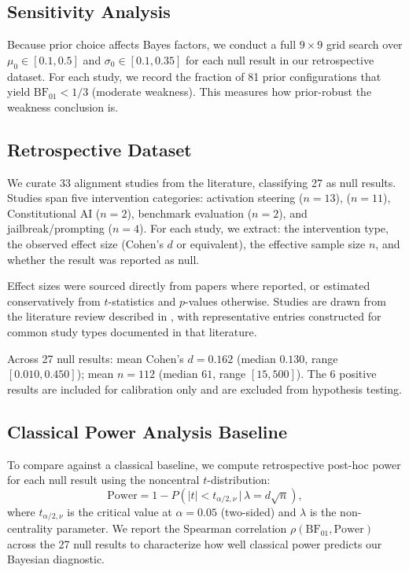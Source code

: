 \subsection{Sensitivity Analysis}

Because prior choice affects Bayes factors, we conduct a full $9 \times 9$ grid
search over $\mu_0 \in [0.1, 0.5]$ and $\sigma_0 \in [0.1, 0.35]$ for each null
result in our retrospective dataset. For each study, we record the fraction of 81
prior configurations that yield $\mathrm{BF}_{01} < 1/3$ (moderate weakness). This
measures how prior-robust the weakness conclusion is.

\subsection{Retrospective Dataset}

We curate 33 alignment studies from the literature, classifying 27 as null results.
Studies span five intervention categories: activation steering ($n=13$), \rlhf ($n=11$),
Constitutional AI ($n=2$), benchmark evaluation ($n=2$), and jailbreak/prompting
($n=4$). For each study, we extract: the intervention type, the observed effect size
(Cohen's $d$ or equivalent), the effective sample size $n$, and whether the result
was reported as null.

Effect sizes were sourced directly from papers where reported, or estimated
conservatively from $t$-statistics and $p$-values otherwise. Studies are drawn from
the literature review described in , with representative entries
constructed for common study types documented in that literature.

Across 27 null results: mean Cohen's $d = 0.162$ (median $0.130$, range $[0.010, 0.450]$);
mean $n = 112$ (median $61$, range $[15, 500]$). The 6 positive results are included
for calibration only and are excluded from hypothesis testing.

\subsection{Classical Power Analysis Baseline}

To compare \ours against a classical baseline, we compute retrospective post-hoc
power for each null result using the noncentral $t$-distribution:
\begin{equation}
\text{Power} = 1 - P\!\left(|t| < t_{\alpha/2, \nu} \,\Big|\, \lambda = d\sqrt{n}\right),
\label{eq:power}
\end{equation}
where $t_{\alpha/2, \nu}$ is the critical value at $\alpha = 0.05$ (two-sided) and
$\lambda$ is the non-centrality parameter. We report the Spearman correlation
$\rho(\mathrm{BF}_{01}, \text{Power})$ across the 27 null results to characterize
how well classical power predicts our Bayesian diagnostic.

